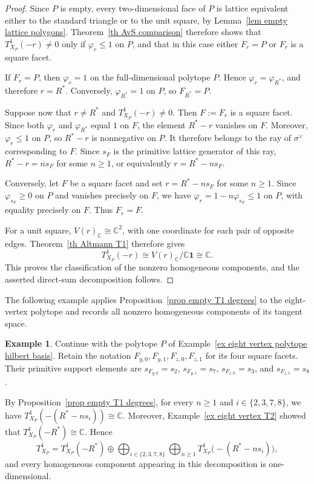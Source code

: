 \documentclass[11pt]{amsart}
\numberwithin{equation}{section}
\theoremstyle{plain}
\theoremstyle{definition}
\newtheorem{example}[theorem]{Example}
\newcommand{\0}{$0$-mutable}
\newcommand{\CC}{\ensuremath{\mathbb{C}}}
\renewcommand{\1}{$1$-rigid}
\renewcommand{\0}{$0$-mutable}
\begin{document}
\begin{proof}
Since \(P\) is empty, every two-dimensional face of \(P\) is lattice
equivalent either to the standard triangle or to the unit square, by
Lemma~\ref{lem empty lattice polygons}. Theorem~\ref{th AvS comparison}
therefore shows that \(T^1_{X_P}(-r)\neq0\) only if
\(\varphi_r\leq1\) on \(P\), and that in this case either \(F_r=P\) or
\(F_r\) is a square facet.

If \(F_r=P\), then \(\varphi_r=1\) on the full-dimensional polytope
\(P\). Hence \(\varphi_r=\varphi_{R^*}\), and therefore \(r=R^*\).
Conversely, \(\varphi_{R^*}=1\) on \(P\), so \(F_{R^*}=P\).

Suppose now that \(r\neq R^*\) and \(T^1_{X_P}(-r)\neq0\). Then
\(F:=F_r\) is a square facet. Since both \(\varphi_r\) and
\(\varphi_{R^*}\) equal \(1\) on \(F\), the element \(R^*-r\) vanishes
on \(F\). Moreover, \(\varphi_r\leq1\) on \(P\), so \(R^*-r\) is
nonnegative on \(P\). It therefore belongs to the ray of
\(\sigma^\vee\) corresponding to \(F\). Since \(s_F\) is the primitive
lattice generator of this ray, \(R^*-r=ns_F\) for some \(n\geq1\), or
equivalently \(r=R^*-ns_F\).

Conversely, let \(F\) be a square facet and set \(r=R^*-ns_F\) for
some \(n\geq1\). Since \(\varphi_{s_F}\geq0\) on \(P\) and vanishes
precisely on \(F\), we have
\(\varphi_r=1-n\varphi_{s_F}\leq1\) on \(P\), with equality precisely
on \(F\). Thus \(F_r=F\).

For a unit square, \(V(r)_{\CC}\cong\CC^2\), with one coordinate for
each pair of opposite edges. Theorem~\ref{th Altmann T1} therefore gives
\[
T^1_{X_P}(-r)
\cong
V(r)_{\CC}/\CC\mathbf 1
\cong
\CC.
\]
This proves the classification of the nonzero homogeneous components,
and the asserted direct-sum decomposition follows.
\end{proof}


{
The following example applies
Proposition~\ref{prop empty T1 degrees} to the eight-vertex polytope
and records all nonzero homogeneous components of its tangent space.

\begin{example}\label{ex eight vertex T1 degrees}
Continue with the polytope \(P\) of
Example~\ref{ex eight vertex polytope hilbert basis}. Retain the
notation \(F_{y,0},F_{y,1},F_{z,0},F_{z,1}\) for its four square
facets. Their primitive support elements are
\(s_{F_{y,0}}=s_2\), \(s_{F_{y,1}}=s_7\),
\(s_{F_{z,0}}=s_3\), and \(s_{F_{z,1}}=s_8\).

By Proposition~\ref{prop empty T1 degrees}, for every \(n\geq1\) and
\(i\in\{2,3,7,8\}\), we have
\(T^1_{X_P}(-(R^*-ns_i))\cong\CC\). Moreover,
Example~\ref{ex eight vertex T2} showed that
\(T^1_{X_P}(-R^*)\cong\CC\). Hence
\[
T^1_{X_P}
=
T^1_{X_P}(-R^*)
\oplus
\bigoplus_{i\in\{2,3,7,8\}}
\bigoplus_{n\geq1}
T^1_{X_P}\bigl(-(R^*-ns_i)\bigr),
\]
and every homogeneous component appearing in this decomposition is
one-dimensional.
\end{example}
}
\end{document}
